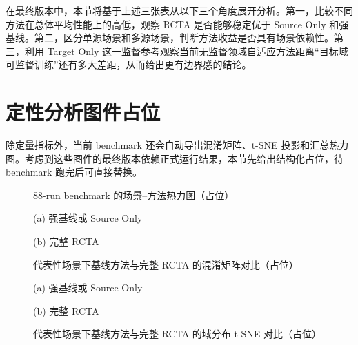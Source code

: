 在最终版本中，本节将基于上述三张表从以下三个角度展开分析。第一，比较不同方法在总体平均性能上的高低，观察 RCTA 是否能够稳定优于 Source Only 和强基线。第二，区分单源场景和多源场景，判断方法收益是否具有场景依赖性。第三，利用 Target Only 这一监督参考观察当前无监督领域自适应方法距离“目标域可监督训练”还有多大差距，从而给出更有边界感的结论。

\section{定性分析图件占位}
除定量指标外，当前 benchmark 还会自动导出混淆矩阵、t-SNE 投影和汇总热力图。考虑到这些图件的最终版本依赖正式运行结果，本节先给出结构化占位，待 benchmark 跑完后可直接替换。

\begin{figure}[htbp]
\centering
{}
\caption{88-run benchmark 的场景--方法热力图（占位）}
\label{fig:benchmark-heatmap}
\end{figure}

\begin{figure}[htbp]
\centering
\begin{minipage}{0.49\textwidth}
\centering
{}
\par
\footnotesize (a) 强基线或 Source Only
\end{minipage}
\hfill
\begin{minipage}{0.49\textwidth}
\centering
{}
\par
\footnotesize (b) 完整 RCTA
\end{minipage}
\caption{代表性场景下基线方法与完整 RCTA 的混淆矩阵对比（占位）}
\label{fig:rcta-confusion}
\end{figure}

\begin{figure}[htbp]
\centering
\begin{minipage}{0.49\textwidth}
\centering
{}
\par
\footnotesize (a) 强基线或 Source Only
\end{minipage}
\hfill
\begin{minipage}{0.49\textwidth}
\centering
{}
\par
\footnotesize (b) 完整 RCTA
\end{minipage}
\caption{代表性场景下基线方法与完整 RCTA 的域分布 t-SNE 对比（占位）}
\label{fig:rcta-tsne}
\end{figure}

